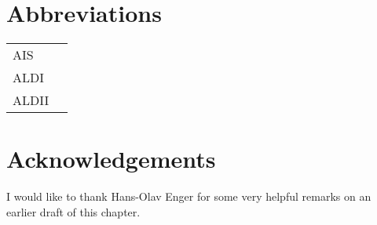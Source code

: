\documentclass[output=paper,
modfonts
]{LSP/langsci}
\begin{document}
\section*{Abbreviations}
\begin{tabular}{ll}
{AIS} & \citet{jaberg1940a}\\
{ALDI} & \citet{goebl1998a} \\
{ALDII} & \citet{goebl2012a}\\
\end{tabular}

\section*{Acknowledgements}
I would like to thank Hans-Olav Enger for some very helpful remarks on an earlier draft of this chapter.

{\sloppy
\printbibliography[heading=subbibliography,notkeyword=this]
}
\end{document}
